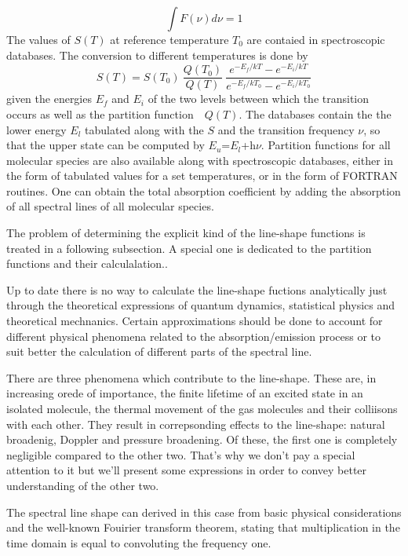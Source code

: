 \begin{equation}
  \int F(\nu)d\nu=1
\label{}
\end{equation}
The values of $S(T)$ at reference temperature $T_0$ are contaied in spectroscopic databases. The conversion to different
temperatures is done by
\begin{equation}
S(T)=S(T_0)~\frac{Q(T_0)}{Q(T)}~\frac{e^{-E_f/kT} - e^{-E_i/kT}}{e^{-E_f/kT_0} - e^{-E_i/kT_0}}
\label{}
\end{equation}
given the energies $E_f$ and $E_i$ of the two levels between which the
transition occurs as well as the partition function~~$Q(T)$. The
databases contain the the lower energy $E_l$ tabulated along with the
$S$ and the transition frequency $\nu$, so that the upper state can be
computed by $E_u$=$E_l$+h$\nu$. Partition functions for all molecular species are also
available along with spectroscopic databases, either in the form of tabulated values for a set
temperatures, or in the form of FORTRAN routines. One can obtain the total absorption
coefficient by adding the absorption of all spectral lines of all
molecular species.

The problem of determining the explicit kind of the line-shape
functions is treated in a following subsection. A special one is
dedicated to the partition functions and their calculalation..


Up to date there is no way to calculate the line-shape fuctions
analytically just through the theoretical expressions of quantum dynamics,
statistical physics and theoretical mechnanics. Certain approximations
should be done to account for different physical phenomena related to
the absorption/emission process or to suit better the calculation of
different parts of the spectral line.

There are three phenomena which contribute to the line-shape. These
are, in increasing orede of importance, the finite lifetime of an
excited state in an isolated molecule, the thermal movement of the gas
molecules and their colliisons with each other. They result in
correpsonding effects to the line-shape: natural broadenig, Doppler
and pressure broadening. Of these, the first one is completely
negligible compared to the other two. That's why we don't pay a special
attention to it but we'll present some expressions in order to convey
better understanding of the other two.

The spectral line shape can derived in this case from basic physical
considerations and the well-known Fouirier transform theorem, stating
that  multiplication in the time domain is equal to convoluting the
frequency one.

